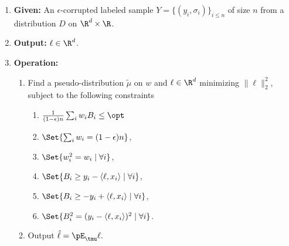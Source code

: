 \begin{enumerate}
  \item \textbf{Given: } An $\epsilon$-corrupted labeled sample $Y = \{ (y_i, \sigma_i)\}_{i \leq n}$ of size $n$ from a distribution $D$ on $\R^d \times \R$. 

  \item \textbf{Output: } $\ell \in \R^{d}$. 

  \item \textbf{Operation: } 
    \begin{enumerate}
      \item Find a pseudo-distribution $\tilde{\mu}$ on $w$ and $\ell \in \R^{d}$ minimizing $\|\ell\|_2^2$, subject to the following constraints
      \begin{enumerate}
        \item $\frac{1}{(1-\epsilon)n} \sum_i w_i B_i \leq \opt$
        \item $\Set{\sum_i w_i = (1-\epsilon)n}$,
        \item $\Set{w_i^2 = w_i \mid \forall i}$,
        \item $\Set{B_i \geq y_i - \langle \ell, x_i \rangle \mid \forall i}$,
        \item $\Set{B_i \geq -y_i + \langle \ell, x_i \rangle \mid \forall i}$,
        \item $\Set{B_i^2 = (y_i - \langle \ell, x_i \rangle)^2 \mid \forall i}$.
      \end{enumerate}
      \item Output $\hat{\ell} = \pE_{\tmu} \ell.$
    \end{enumerate}
\end{enumerate}

